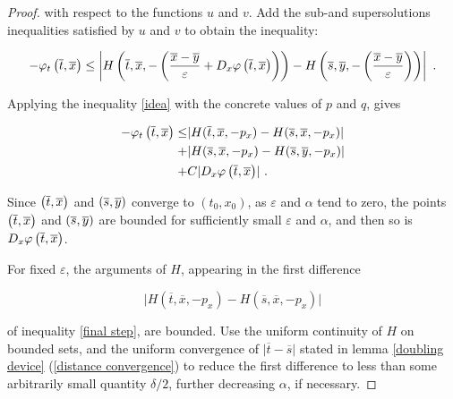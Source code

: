 \begin{theorem}
\begin{proof}
		  		with respect to the functions $ u $ and $ v. $ Add the sub-and supersolutions inequalities satisfied by $ u $ and $ v $ to obtain the inequality:
		  		
		  		\begin{equation*}
		  			- \varphi_t\left(\overline{t}, \overline{x}\right) 
		  			\leq \left\lvert H \left( \overline{t}, \overline{x}, - \left( \frac{\overline{x} - \overline{y}}{\varepsilon} + D_x \varphi\left(\overline{t}, \overline{x}\right) \right)  \right)
		  			- H \left( \overline{s}, \overline{y}, - \left( \frac{\overline{x} - \overline{y}}{\varepsilon} \right) \right) \right\rvert \ .
		  		\end{equation*}
		  		
		  		Applying the inequality \eqref{idea} with the concrete values of $ p $ and $ q $, gives
		  		
		  		\begin{equation}
		  		\label{final step}
		  			\begin{split}
		  				- \varphi_t\left(\overline{t}, \overline{x}\right) \leq
		  				&\lvert H(\overline{t}, \overline{x}, -p_x) - H(\overline{s}, \overline{x}, -p_x) \rvert \\
		  				+&\lvert H(\overline{s}, \overline{x}, -p_x) - H(\overline{s}, \overline{y}, -p_x) \rvert \\
		  				+& C \lvert D_x \varphi\left(\overline{t}, \overline{x}\right) \rvert \ .
		  			\end{split}
		  		\end{equation}
		  		
		  		Since $ \left(\overline{t}, \overline{x}\right) $ and $ \left(\overline{s}, \overline{y}\right) $ converge to $ (t_0, x_0) $, as $ \varepsilon $ and $ \alpha $ tend to zero, the points $ \left(\overline{t}, \overline{x}\right) $ and $ \left(\overline{s}, \overline{y}\right) $ are bounded for sufficiently small $ \varepsilon $ and $ \alpha $, and then so is $ D_x \varphi\left(\overline{t}, \overline{x}\right) $.
		  		
		  		For fixed $ \varepsilon $, the arguments of $ H $, appearing in the first difference 
		  		
		  		\begin{equation*}
		  			\lvert H(\overline{t}, \overline{x}, -p_x) - H(\overline{s}, \overline{x}, -p_x) \rvert 
		  		\end{equation*}
		  		
		  		of inequality \eqref{final step}, 
		  		are bounded. Use the uniform continuity of $ H $ on bounded sets, and the uniform convergence of $ \lvert \overline{t} - \overline{s} \rvert $ stated in lemma \ref{doubling device} (\ref{distance convergence}) to reduce the first difference to less than some arbitrarily small quantity $ \delta / 2 $, further decreasing $ \alpha $, if necessary.
		  		

\end{proof}
\end{theorem}
